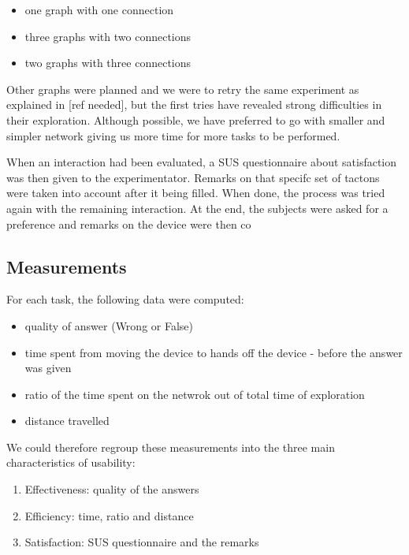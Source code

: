 \begin{itemize}
\item
  one graph with one connection
\item
  three graphs with two connections
\item
  two graphs with three connections
\end{itemize}

Other graphs were planned and we were to retry the same experiment as
explained in {[}ref needed{]}, but the first tries have revealed strong
difficulties in their exploration. Although possible, we have preferred
to go with smaller and simpler network giving us more time for more
tasks to be performed.

When an interaction had been evaluated, a SUS questionnaire about
satisfaction was then given to the experimentator. Remarks on that
specifc set of tactons were taken into account after it being filled.
When done, the process was tried again with the remaining interaction.
At the end, the subjects were asked for a preference and remarks on the
device were then co

\subsection{Measurements}\label{measurements}

For each task, the following data were computed:

\begin{itemize}
\item
  quality of answer (Wrong or False)
\item
  time spent from moving the device to hands off the device - before the
  answer was given
\item
  ratio of the time spent on the netwrok out of total time of
  exploration
\item
  distance travelled
\end{itemize}

We could therefore regroup these measurements into the three main
characteristics of usability:

\begin{enumerate}
\def\labelenumi{\arabic{enumi}.}
\item
  Effectiveness: quality of the answers
\item
  Efficiency: time, ratio and distance
\item
  Satisfaction: SUS questionnaire and the remarks
\end{enumerate}

